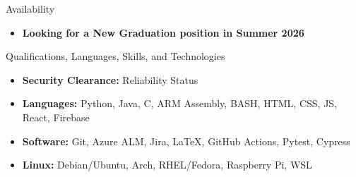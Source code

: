 \documentclass[]{mcdowellcv}
\begin{document}
	\makeheader

	\begin{cvsection}{Availability}
		\begin{cvsubsection}{}{}{}
			\begin{itemize}
				\item \textbf{Looking for a New Graduation position in Summer 2026}
			\end{itemize}
		\end{cvsubsection}
	\end{cvsection}

	\begin{cvsection}{Qualifications, Languages, Skills, and Technologies}
		\begin{cvsubsection}{}{}{}	
			\begin{itemize}
					\item \textbf{Security Clearance:} Reliability Status
					\item \textbf{Languages:} Python, Java, C, ARM Assembly, BASH, HTML, CSS, JS, React, Firebase
					\item \textbf{Software:} Git, Azure ALM, Jira, \LaTeX, GitHub Actions, Pytest, Cypress
					\item \textbf{Linux:} Debian/Ubuntu, Arch, RHEL/Fedora, Raspberry Pi, WSL
			\end{itemize}
		\end{cvsubsection}
	\end{cvsection}
\end{document}
